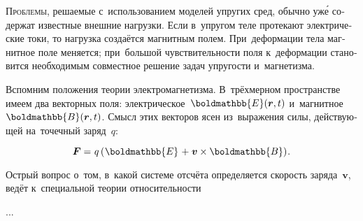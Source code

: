 

\thispagestyle{empty}

\label{chapter:magnetoelasticity}



\label{para:electromagneticfield}

\begin{otherlanguage}{russian}

\lettrine[lines=2, findent=2pt, nindent=0pt]{П}{роблемы}, решаемые с~использованием моделей упругих сред, обычно уж\'{е} содержат известные внешние нагрузки. %
Если в~упругом теле протекают электрические токи, то нагрузка создаётся магнитным полем. При~деформации тела магнитное поле меняется; при~большой чувствительности поля к~деформации становится необходимым совместное решение задач упругости и~магнетизма.

Вспомним положения теории электромагнетизма. В~трёхмерном пространстве имеем два векторных поля: электрическое~${\boldmathbb{E}(\bm{r},t)}$ и~магнитное~${\boldmathbb{B}(\bm{r},t)}$. Смысл этих векторов ясен из~выражения силы, действующей на~точечный заряд~$q$:

\nopagebreak\vspace{-0.1em}\begin{equation}
\bm{F} = \hspace{.12ex} q \left( \hspace{.1ex} \boldmathbb{E} \hspace{.2ex} + \hspace{.1ex} \bm{v} \times \boldmathbb{B} \right) \hspace{-0.25ex}.
\end{equation}

\vspace{-0.1em} Острый вопрос о~том, в~какой системе отсчёта определяется скорость заряда~$\bm{v}$, ведёт к~специальной теории относительности

...



\end{otherlanguage}

